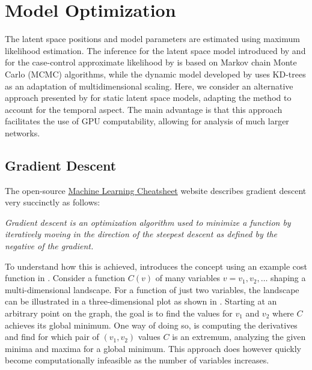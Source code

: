     
\section{Model Optimization}

    The latent space positions and model parameters are estimated using maximum likelihood estimation. The inference for the latent space model introduced by \citeauthor*{hoff2002latent} and for the case-control approximate likelihood by \citeauthor*{raftery2012fast} is based on Markov chain Monte Carlo (MCMC) algorithms, while the dynamic model developed by \citeauthor{sarkar2005dynamic} uses KD-trees as an adaptation of multidimensional scaling. Here, we consider an alternative approach presented by \citeauthor{jacobsen2018a} for static latent space models, adapting the method to account for the temporal aspect. The main advantage is that this approach facilitates the use of GPU computability, allowing for analysis of much larger networks.

    \subsection{Gradient Descent}
    
        The open-source \href{https://ml-cheatsheet.readthedocs.io/en/latest/index.html}{Machine Learning Cheatsheet} website describes gradient descent very succinctly as follows:
        \begin{displayquote}\itshape
            Gradient descent is an optimization algorithm used to minimize a function by iteratively moving in the direction of the steepest descent as defined by the negative of the gradient. 
        \end{displayquote}
        
        To understand how this is achieved, \citeauthor{nielsen2018neural} introduces the concept using an example cost function in \cite{nielsen2018neural}.
        Consider a function $C(v)$ of many variables $v = v_1, v_2, \dots$ shaping a multi-dimensional landscape. For a function of just two variables, the landscape can be illustrated in a three-dimensional plot as shown in . 
        Starting at an arbitrary point on the graph, the goal is to find the values for $v_1$ and $v_2$ where $C$ achieves its global minimum. One way of doing so, is computing the derivatives and find for which pair of $(v_1,v_2)$ values $C$ is an extremum, analyzing the given minima and maxima for a global minimum. This approach does however quickly become computationally infeasible as the number of variables increases. 
        
